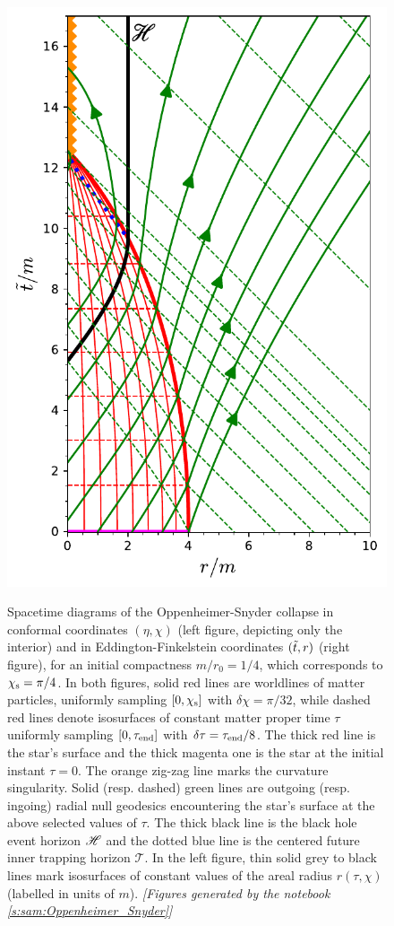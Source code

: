 \begin{figure}
{\includegraphics[height=0.6\textheight]{lem_OS_diag_EF.pdf}
}
\caption[]{\label{f:lem:OS:diag_int_EF} \footnotesize
Spacetime diagrams of the Oppenheimer-Snyder collapse
in conformal coordinates $(\eta,\chi)$ (left figure, depicting only the
interior)
and in Eddington-Finkelstein coordinates $({\tilde t}, r)$
(right figure), for an initial compactness $m/r_0 = 1/4$, which corresponds to $\chi_{\rm s} = \pi/4$.
In both figures, solid red lines are worldlines of matter particles,
uniformly sampling $[0,\chi_{\rm s}]$ with $\delta\chi=\pi/32$,
while dashed red lines denote isosurfaces of constant matter proper time $\tau$
uniformly sampling $[0,\tau_{\rm end}]$ with $\delta\tau = \tau_{\rm end}/8$.
The thick red line is the star's surface and the thick magenta one is
the star at the initial instant $\tau=0$. The orange zig-zag line marks the
curvature singularity. Solid (resp. dashed) green lines are outgoing (resp. ingoing) radial null geodesics
encountering the star's surface at the above selected values of $\tau$.
The thick black line is the black hole event horizon $\mathscr{H}$ and the dotted blue line
is the centered future inner trapping horizon $\mathscr{T}$. In the left figure,
thin solid grey to black lines mark isosurfaces of constant values of the areal radius
$r(\tau,\chi)$ (labelled in units of $m$).
\textsl{[Figures generated by the notebook \ref{s:sam:Oppenheimer_Snyder}]}
}
\end{figure}


